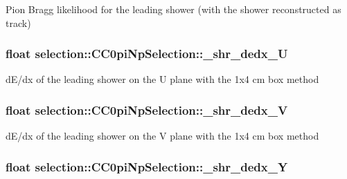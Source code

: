 Pion Bragg likelihood for the leading shower (with the shower reconstructed as track) \hypertarget{classselection_1_1CC0piNpSelection_ada2f72c2f814e7d06c24a50ff5ad4fcc}{
\subsubsection[{\-\_\-shr\-\_\-dedx\-\_\-\-U}]{\setlength{\rightskip}{0pt plus 5cm}float selection\-::\-C\-C0pi\-Np\-Selection\-::\-\_\-shr\-\_\-dedx\-\_\-\-U\hspace{0.3cm}{\ttfamily [private]}}}\label{classselection_1_1CC0piNpSelection_ada2f72c2f814e7d06c24a50ff5ad4fcc}
d\-E/dx of the leading shower on the U plane with the 1x4 cm box method \hypertarget{classselection_1_1CC0piNpSelection_a392211f6d023d92bf113c20098c5e7fe}{
\subsubsection[{\-\_\-shr\-\_\-dedx\-\_\-\-V}]{\setlength{\rightskip}{0pt plus 5cm}float selection\-::\-C\-C0pi\-Np\-Selection\-::\-\_\-shr\-\_\-dedx\-\_\-\-V\hspace{0.3cm}{\ttfamily [private]}}}\label{classselection_1_1CC0piNpSelection_a392211f6d023d92bf113c20098c5e7fe}
d\-E/dx of the leading shower on the V plane with the 1x4 cm box method \hypertarget{classselection_1_1CC0piNpSelection_a1af96c31bd3afe4b111f429927bbff1c}{
\subsubsection[{\-\_\-shr\-\_\-dedx\-\_\-\-Y}]{\setlength{\rightskip}{0pt plus 5cm}float selection\-::\-C\-C0pi\-Np\-Selection\-::\-\_\-shr\-\_\-dedx\-\_\-\-Y\hspace{0.3cm}{\ttfamily [private]}}}\label{classselection_1_1CC0piNpSelection_a1af96c31bd3afe4b111f429927bbff1c}
